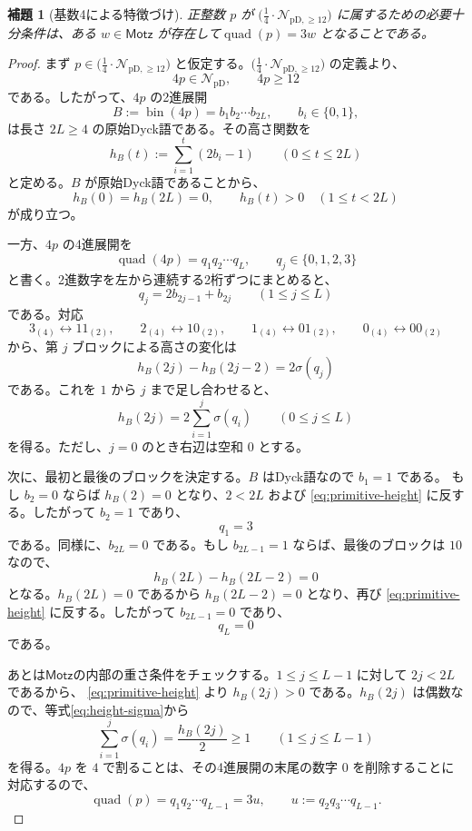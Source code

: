 \documentclass[12pt]{ltjsarticle}
\theoremstyle{plain}
\newtheorem{lemma}[theorem]{補題}
\theoremstyle{definition}
\theoremstyle{plain}
\newcommand{\NpD}{\mathcal{N}_{\mathrm{pD}}}
\newcommand{\Pset}{%
  \bigl(\tfrac{1}{4}\cdot\mathcal{N}_{\mathrm{pD},\geq 12}\bigr)%
}
\begin{document}
\begin{lemma}[基数4による特徴づけ]\label{lem:base4}
正整数 $p$ が $\Pset$ に属するための必要十分条件は、ある $w\in\mathsf{Motz}$ が存在して$ \operatorname{quad}(p)=3w$
となることである。
\end{lemma}

\begin{proof}
まず $p\in\Pset$ と仮定する。$\Pset$ の定義より、
\[
 4p\in\NpD,\qquad 4p\geq12
\]
である。したがって、$4p$ の2進展開
\[
 B:=\operatorname{bin}(4p)=b_1b_2\cdots b_{2L},
 \qquad b_i\in\{0,1\},
\]
は長さ $2L\geq4$ の原始Dyck語である。その高さ関数を
\[
 h_B(t):=\sum_{i=1}^{t}(2b_i-1)
 \qquad(0\leq t\leq2L)
\]
と定める。$B$ が原始Dyck語であることから、
\begin{equation}\label{eq:primitive-height}
 h_B(0)=h_B(2L)=0,
 \qquad
 h_B(t)>0\quad(1\leq t<2L)
\end{equation}
が成り立つ。

一方、$4p$ の4進展開を
\[
 \operatorname{quad}(4p)=q_1q_2\cdots q_L,
 \qquad q_j\in\{0,1,2,3\}
\]
と書く。2進数字を左から連続する2桁ずつにまとめると、
\[
 q_j=2b_{2j-1}+b_{2j}
 \qquad(1\leq j\leq L)
\]
である。対応
\[
 3_{(4)}\longleftrightarrow11_{(2)},\qquad
 2_{(4)}\longleftrightarrow10_{(2)},\qquad
 1_{(4)}\longleftrightarrow01_{(2)},\qquad
 0_{(4)}\longleftrightarrow00_{(2)}
\]
から、第 $j$ ブロックによる高さの変化は
\[
 h_B(2j)-h_B(2j-2)=2\sigma(q_j)
\]
である。これを $1$ から $j$ まで足し合わせると、
\begin{equation}\label{eq:height-sigma}
 h_B(2j)=2\sum_{i=1}^{j}\sigma(q_i)
 \qquad(0\leq j\leq L)
\end{equation}
を得る。ただし、$j=0$ のとき右辺は空和 $0$ とする。

次に、最初と最後のブロックを決定する。$B$ はDyck語なので $b_1=1$ である。
もし $b_2=0$ ならば $h_B(2)=0$ となり、$2<2L$ および
\eqref{eq:primitive-height} に反する。したがって $b_2=1$ であり、
\[
 q_1=3
\]
である。同様に、$b_{2L}=0$ である。もし $b_{2L-1}=1$ ならば、最後のブロックは
$10$ なので、
\[
 h_B(2L)-h_B(2L-2)=0
\]
となる。$h_B(2L)=0$ であるから $h_B(2L-2)=0$ となり、再び
\eqref{eq:primitive-height} に反する。したがって $b_{2L-1}=0$ であり、
\[
 q_L=0
\]
である。

あとは$\mathsf{Motz}$の内部の重さ条件をチェックする。$1\leq j\leq L-1$ に対して $2j<2L$ であるから、
\eqref{eq:primitive-height} より $h_B(2j)>0$ である。$h_B(2j)$ は偶数なので、等式\eqref{eq:height-sigma}から
\begin{equation}\label{eq:prefix-height}
 \sum_{i=1}^{j}\sigma(q_i)
 =\frac{h_B(2j)}{2}
 \geq1
 \qquad(1\leq j\leq L-1)
\end{equation}
を得る。$4p$ を $4$ で割ることは、その4進展開の末尾の数字 $0$ を削除することに
対応するので、
\[
 \operatorname{quad}(p)=q_1q_2\cdots q_{L-1}=3u,
 \qquad
 u:=q_2q_3\cdots q_{L-1}.
\]


\end{proof}
\end{document}
